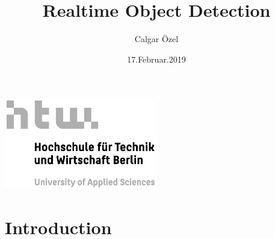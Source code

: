 \documentclass{article}
\begin{document}
    \begin{titlepage}

        \begin{center}
            \includegraphics[width=0.5\textwidth]{images/htw-logo.jpg}
        \end{center}

        \title{Realtime Object Detection}
        \author{Calgar Özel}
        \date{17.Februar.2019}

    \end{titlepage}

    \maketitle

    \section{Introduction}
    
\end{document}
